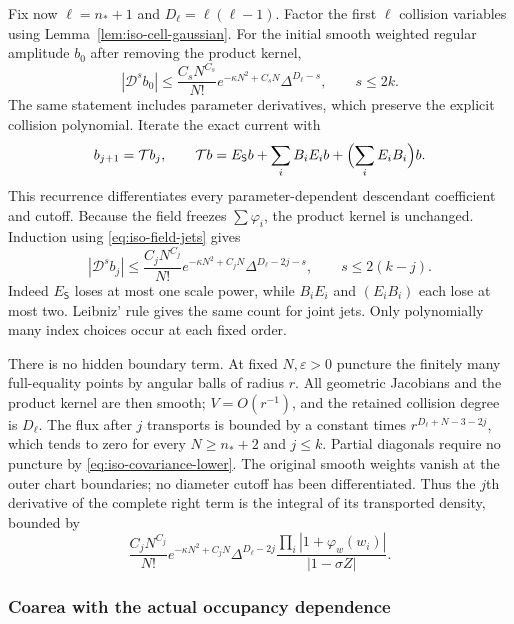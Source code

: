 \documentclass[11pt]{article}
\numberwithin{equation}{section}
\theoremstyle{definition}
\newcommand{\eps}{\varepsilon}
\begin{document}
Fix now $\ell=n_*+1$ and $D_\ell=\ell(\ell-1)$.
Factor the first $\ell$ collision variables using
Lemma~\ref{lem:iso-cell-gaussian}.  For the initial smooth weighted
regular amplitude $b_0$ after removing the product kernel,
\[
 |\mathcal D^s b_0|
 \le\frac{C_sN^{C_s}}{N!}e^{-\kappa N^2+C_sN}
                     \Delta^{D_\ell-s},\qquad s\le2k.
\]
The same statement includes parameter derivatives, which preserve the
explicit collision polynomial.  Iterate the exact current with
\begin{equation}\label{eq:iso-transport-recurrence}
 b_{j+1}=\mathcal T b_j,\qquad
 \mathcal T b=E_{\mathsf S}b+\sum_iB_iE_i b
                              +\Bigl(\sum_iE_iB_i\Bigr)b.
\end{equation}
This recurrence differentiates every parameter-dependent descendant
coefficient and cutoff.  Because the field freezes $\sum\varphi_i$,
the product kernel is unchanged.  Induction using
\eqref{eq:iso-field-jets} gives
\begin{equation}\label{eq:iso-transported-amplitude}
 |\mathcal D^s b_j|
 \le\frac{C_jN^{C_j}}{N!}e^{-\kappa N^2+C_jN}
              \Delta^{D_\ell-2j-s},\qquad s\le2(k-j).
\end{equation}
Indeed $E_{\mathsf S}$ loses at most one scale power, while
$B_iE_i$ and $(E_iB_i)$ each lose at most two.  Leibniz' rule gives
the same count for joint jets.  Only polynomially many index choices
occur at each fixed order.

There is no hidden boundary term.  At fixed $N,\eps>0$ puncture
the finitely many full-equality points by angular balls of radius
$r$.  All geometric Jacobians and the product kernel are then smooth;
$V=O(r^{-1})$, and the retained collision degree is $D_\ell$.
The flux after $j$ transports is bounded by a constant times
$r^{D_\ell+N-3-2j}$, which tends to zero for every $N\ge n_*+2$
and $j\le k$.  Partial diagonals require no puncture by
\eqref{eq:iso-covariance-lower}.  The original smooth weights vanish
at the outer chart boundaries; no diameter cutoff has been
differentiated.  Thus the $j$th derivative of the complete right term
is the integral of its transported density, bounded by
\begin{equation}\label{eq:iso-transported-density}
 \frac{C_jN^{C_j}}{N!}e^{-\kappa N^2+C_jN}
 \Delta^{D_\ell-2j}
 \frac{\prod_i|1+\varphi_w(w_i)|}{|1-\sigma Z|}.
\end{equation}

\subsubsection{Coarea with the actual occupancy dependence}
\end{document}
